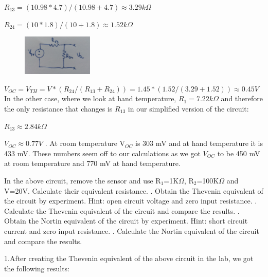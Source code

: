 {\begin{solution}
		$R_{13}=(10.98*4.7)/(10.98+4.7)\approx3.29k\Omega$
		
		$R_{24}=(10*1.8)/(10+1.8)\approx1.52k\Omega$
		
		\begin{figure}[h!]
			\centering
			\includegraphics[width=0.3\textwidth]{images/circuit214.jpg}
		\end{figure}
		
		$V_{OC}=V_{TH}=V*(R_{24}/(R_{13}+R_{24}))=1.45*(1.52/(3.29+1.52))\approx0.45V$
		\\
		In the other case, where we look at hand temperature, $R_{1}=7.22k\Omega$ and therefore the only resistance that changes is $R_{13}$ in our simplified version of the circuit:
		
		$R_{13}\approx2.84k\Omega$
		
		$V_{OC}\approx0.77V$
		. At room temperature V$_{OC}$ is 303 mV and at hand temperature it is 433 mV. These numbers seem off to our calculations as we got $V_{OC}$ to be 450 mV at room temperature and 770 mV at hand temperature.
	\end{solution}
	\clearpage
	\begin{problem}
		In the above circuit, remove the sensor and use R\(_{1}\)=1K\(\Omega\), R\(_{2}\)=100K\(\Omega\) and V=20V. Calculate their equivalent resistance.
		. Obtain the Thevenin equivalent of the circuit by experiment. Hint: open circuit voltage and zero input resistance.
		. Calculate the Thevenin equivalent of the circuit and compare the results.
		. Obtain the Nortin equivalent of the circuit by experiment. Hint: short circuit current and zero input resistance.
		. Calculate the Nortin equivalent of the circuit and compare the results.
	\end{problem}
	
	\begin{solution}
		1.After creating the Thevenin equivalent of the above circuit in the lab, we got the following results:
		

\end{solution}}
